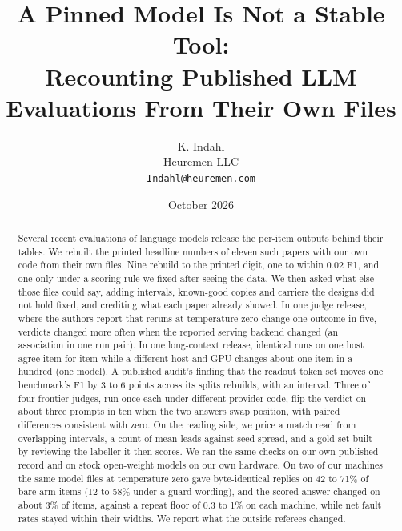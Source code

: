 \documentclass[11pt]{article}
\title{A Pinned Model Is Not a Stable Tool:\\ Recounting Published LLM Evaluations From Their Own Files}
\author{K. Indahl\\ Heuremen LLC\\ \texttt{Indahl@heuremen.com}}
\date{October 2026}
\begin{document}
\maketitle
\begin{abstract}
Several recent evaluations of language models release the per-item outputs behind their tables. We rebuilt the printed headline numbers of eleven
such papers with our own code from their own files. Nine rebuild to the printed digit, one to within 0.02 F1, and one only under a
scoring rule we fixed after seeing the data. We then asked what else those files could say, adding intervals,
known-good copies and carriers the designs did not hold fixed, and crediting what each paper already showed. In one judge release, where the
authors report that reruns at temperature zero change one outcome in five, verdicts changed more often when the reported serving backend
changed (an association in one run pair). In one long-context release, identical runs on one host agree item for item while a different
host and GPU changes about one item in a hundred (one model). A published audit's finding that the readout token set moves one benchmark's
F1 by 3 to 6 points across its splits rebuilds, with an interval. Three of four frontier judges, run once each under different provider code, flip
the verdict on about three prompts in ten when the two answers swap position, with paired differences consistent with zero. On the reading
side, we price a match read from overlapping intervals, a count of mean leads against seed spread, and a gold set built by reviewing the
labeller it then scores. We ran the same checks on our own published record and on stock open-weight models on our own hardware. On two of our machines the same
model files at temperature zero gave byte-identical replies on 42 to 71\% of bare-arm items (12 to 58\% under a guard wording), and the scored answer
changed on about 3\% of items, against a repeat floor of 0.3 to 1\% on each machine, while net fault rates stayed within their widths.
We report what the outside referees changed.
\end{abstract}
\end{document}

